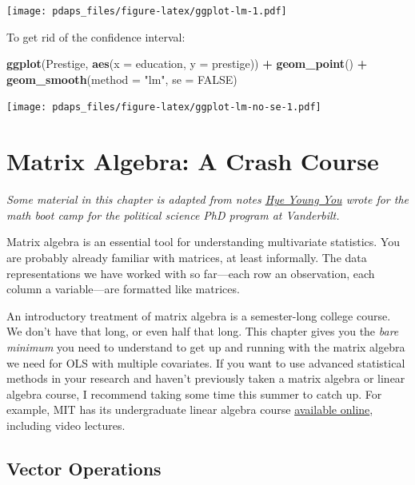 \documentclass[
  12pt,
  oneside,openany]{book}
\newenvironment{Shaded}{\begin{snugshade}}{\end{snugshade}}
\newcommand{\DataTypeTok}[1]{\textcolor[rgb]{0.13,0.29,0.53}{#1}}
\newcommand{\KeywordTok}[1]{\textcolor[rgb]{0.13,0.29,0.53}{\textbf{#1}}}
\newcommand{\NormalTok}[1]{#1}
\newcommand{\OperatorTok}[1]{\textcolor[rgb]{0.81,0.36,0.00}{\textbf{#1}}}
\newcommand{\OtherTok}[1]{\textcolor[rgb]{0.56,0.35,0.01}{#1}}
\newcommand{\StringTok}[1]{\textcolor[rgb]{0.31,0.60,0.02}{#1}}
\begin{document}
\texttt{[image: pdaps\_files/figure-latex/ggplot-lm-1.pdf]}

To get rid of the confidence interval:

\begin{Shaded}
\begin{Highlighting}[]
\KeywordTok{ggplot}\NormalTok{(Prestige, }\KeywordTok{aes}\NormalTok{(}\DataTypeTok{x =}\NormalTok{ education, }\DataTypeTok{y =}\NormalTok{ prestige)) }\OperatorTok{+}
\StringTok{  }\KeywordTok{geom\_point}\NormalTok{() }\OperatorTok{+}
\StringTok{  }\KeywordTok{geom\_smooth}\NormalTok{(}\DataTypeTok{method =} \StringTok{"lm"}\NormalTok{, }\DataTypeTok{se =} \OtherTok{FALSE}\NormalTok{)}
\end{Highlighting}
\end{Shaded}

\texttt{[image: pdaps\_files/figure-latex/ggplot-lm-no-se-1.pdf]}

\hypertarget{matrix}{%
\chapter{Matrix Algebra: A Crash Course}\label{matrix}}

\emph{Some material in this chapter is adapted from notes \href{https://hyeyoungyou.com}{Hye Young You} wrote for the math boot camp for the political science PhD program at Vanderbilt.}

Matrix algebra is an essential tool for understanding multivariate statistics. You are probably already familiar with matrices, at least informally. The data representations we have worked with so far---each row an observation, each column a variable---are formatted like matrices.

An introductory treatment of matrix algebra is a semester-long college course. We don't have that long, or even half that long. This chapter gives you the \emph{bare minimum} you need to understand to get up and running with the matrix algebra we need for OLS with multiple covariates. If you want to use advanced statistical methods in your research and haven't previously taken a matrix algebra or linear algebra course, I recommend taking some time this summer to catch up. For example, MIT has its undergraduate linear algebra course \href{https://ocw.mit.edu/courses/mathematics/18-06-linear-algebra-spring-2010/index.htm}{available online}, including video lectures.

\hypertarget{vector-operations}{%
\section{Vector Operations}\label{vector-operations}}
\end{document}
